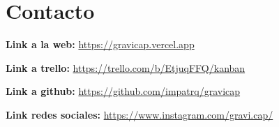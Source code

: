 \chapter{Contacto}

    \textbf{Link a la web:}
    \href{https://gravicap.vercel.app}{https://gravicap.vercel.app} 
    
    \textbf{Link a trello:}
    \href{https://trello.com/b/EtjuqFFQ/kanban}{https://trello.com/b/EtjuqFFQ/kanban}
    
    \textbf{Link a github:}
    \href{https://github.com/impatrq/gravicap}{https://github.com/impatrq/gravicap}
    
    \textbf{Link redes sociales:}
    \href{https://www.instagram.com/gravi.cap/}{https://www.instagram.com/gravi.cap/}